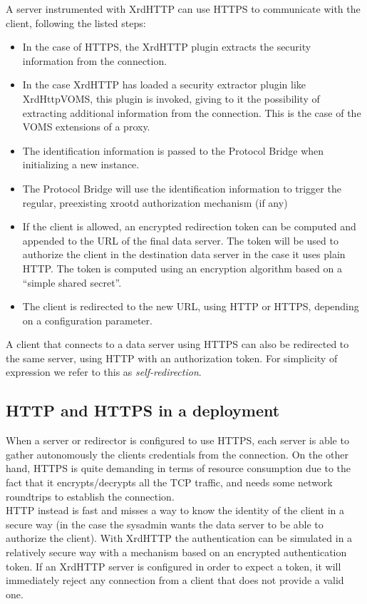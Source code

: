 \documentclass[12pt]{article} %
\begin{document}
A server instrumented with XrdHTTP can use HTTPS to communicate with the client, following the listed steps:

\begin{itemize}
 \item In the case of HTTPS, the XrdHTTP plugin extracts the security information from the connection.
 \item In the case XrdHTTP has loaded a security extractor plugin like XrdHttpVOMS, this plugin is invoked, giving to it the possibility of
extracting additional information from the connection. This is the case of the VOMS extensions of a proxy.
 \item The identification information is passed to the Protocol Bridge when initializing a new instance.
 \item The Protocol Bridge will use the identification information to trigger the regular, preexisting xrootd authorization mechanism (if any)
 \item If the client is allowed, an encrypted redirection token can be computed and appended to the URL of the final data server. The token will be used to authorize the client in the destination data server in the case it uses plain HTTP. The token is computed using an encryption algorithm based on a ``simple shared secret''.
 \item The client is redirected to the new URL, using HTTP or HTTPS, depending on a configuration parameter.
\end{itemize}


A client that connects to a data server using HTTPS can also be redirected to the same server, using HTTP with an authorization token. For simplicity of expression we refer to this as \textit{self-redirection}.

\subsection{HTTP and HTTPS in a deployment}

When a server or redirector is configured to use HTTPS, each server is able to gather autonomously the clients credentials from the connection. On the other hand, HTTPS is quite demanding in terms of resource consumption due to the fact that it encrypts/decrypts all the TCP traffic, and needs some network roundtrips to establish the connection.\\

HTTP instead is fast and misses a way to know the identity of the client in a secure way (in the case the sysadmin wants the data server to be able to authorize the client).
With XrdHTTP the authentication can be simulated in a relatively secure way with a mechanism based on an encrypted authentication token. If an XrdHTTP server is configured in order to expect a token, it will immediately reject any connection from a client that does not provide a valid one.\\
\end{document}
